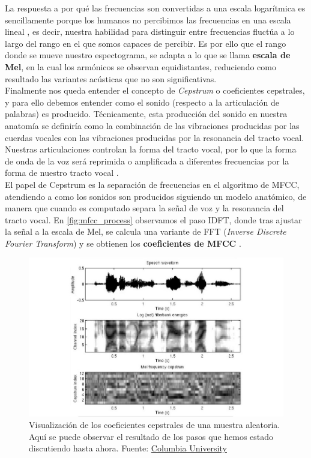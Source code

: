 \documentclass[11pt,a4paper,spanish]{book}
\begin{document}
	La respuesta a por qué las frecuencias son convertidas a una escala logarítmica es sencillamente porque los humanos no percibimos las frecuencias en una escala lineal \cite{Varshney}, es decir, nuestra habilidad para distinguir entre frecuencias fluctúa a lo largo del rango en el que somos capaces de percibir\cite{StevensVolkmann}. Es por ello que el rango donde se mueve nuestro espectograma, se adapta a lo que se llama \textbf{escala de Mel}, en la cual los armónicos se observan equidistantes, reduciendo como resultado las variantes acústicas que no son significativas.\\
	
	Finalmente nos queda entender el concepto de \emph{Cepstrum} o coeficientes cepstrales, y para ello debemos entender como el sonido (respecto a la articulación de palabras) es producido. Técnicamente, esta producción del sonido en nuestra anatomía se definiría como la combinación de las vibraciones producidas por las cuerdas vocales con las vibraciones producidas por la resonancia del tracto vocal. Nuestras articulaciones controlan la forma del tracto vocal, por lo que la forma de onda de la voz será reprimida o amplificada a diferentes frecuencias por la forma de nuestro tracto vocal \cite{Bao2019}.\\
	El papel de Cepstrum es la separación de frecuencias en el algoritmo de MFCC, atendiendo a como los sonidos son producidos siguiendo un modelo anatómico, de manera que cuando es computado separa la señal de voz y la resonancia del tracto vocal. En \ref{fig:mfcc_process} observamos el paso IDFT, donde tras ajustar la señal a la escala de Mel, se calcula una variante de FFT (\emph{Inverse Discrete Fourier Transform}) y se obtienen los \textbf{coeficientes de MFCC} \cite{Nair}.
	
	\begin{figure}[h]
		\centering
		\includegraphics[scale=0.3]{waveform_process.jpeg} 
		\caption{Visualización de los coeficientes cepstrales de una muestra aleatoria. Aquí se puede observar el resultado de los pasos que hemos estado discutiendo hasta ahora. Fuente: \href{https://www.ee.columbia.edu/~stanchen/spring16/e6870/slides/lecture3.pdf}{Columbia University}}
	\end{figure}
	
\end{document}
